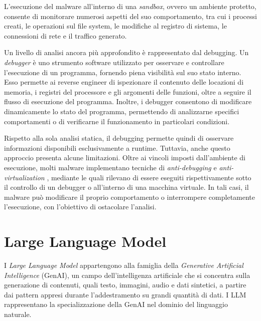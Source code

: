 
L'esecuzione del malware all'interno di una \emph{sandbox}, ovvero un ambiente protetto, consente di monitorare numerosi aspetti del suo comportamento, tra cui i processi creati, le operazioni sul file system, le modifiche al registro di sistema, le connessioni di rete e il traffico generato.


Un livello di analisi ancora più approfondito è rappresentato dal debugging. Un \emph{debugger} \cite{sikorski2012malware} è uno strumento software utilizzato per osservare e controllare l'esecuzione di un programma, fornendo piena visibilità sul suo stato interno. Esso permette ai reverse engineer di ispezionare il contenuto delle locazioni di memoria, i registri del processore e gli argomenti delle funzioni, oltre a seguire il flusso di esecuzione del programma. Inoltre, i debugger consentono di modificare dinamicamente lo stato del programma, permettendo di analizzarne specifici comportamenti o di verificarne il funzionamento in particolari condizioni. %


Rispetto alla sola analisi statica, il debugging permette quindi di osservare informazioni disponibili esclusivamente a runtime. Tuttavia, anche questo approccio presenta alcune limitazioni. Oltre ai vincoli imposti dall'ambiente di esecuzione, molti malware implementano tecniche di \emph{anti-debugging} e \emph{anti-virtualization} \cite{sikorski2012malware}, mediante le quali rilevano di essere eseguiti rispettivamente sotto il controllo di un debugger o all'interno di una macchina virtuale. In tali casi, il malware può modificare il proprio comportamento o interrompere completamente l'esecuzione, con l'obiettivo di ostacolare l'analisi. %

\section{Large Language Model} %

I \emph{Large Language Model} appartengono alla famiglia della \emph{Generative Artificial Intelligence} (GenAI), un campo dell'intelligenza artificiale che si concentra sulla generazione di contenuti, quali testo, immagini, audio e dati sintetici, a partire dai pattern appresi durante l'addestramento su grandi quantità di dati. I LLM rappresentano la specializzazione della GenAI nel dominio del linguaggio naturale.

